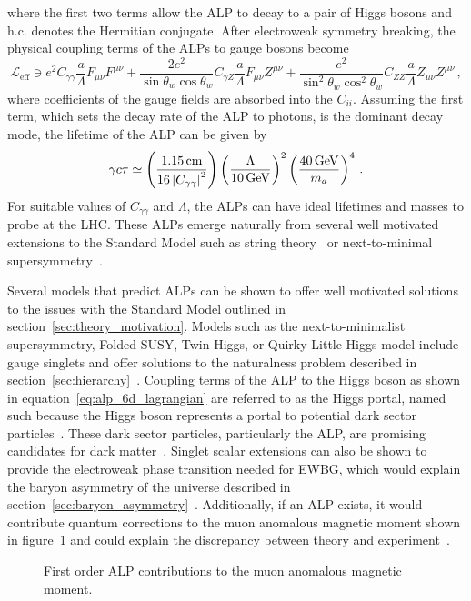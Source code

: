 where the first two terms allow the ALP to decay to a pair of Higgs bosons and h.c. denotes the Hermitian conjugate. After electroweak symmetry breaking, the physical coupling terms of the ALPs to gauge bosons become
\begin{equation}
	\mathcal{L}_\text{eff}\ni e^2C_{\gamma\gamma}\frac{a}{\Lambda}F_{\mu\nu}F^{\mu\nu}+\frac{2e^2}{\sin\theta_w\cos\theta_w}C_{\gamma Z}\frac{a}{\Lambda}F_{\mu\nu}Z^{\mu\nu}+\frac{e^2}{\sin^2\theta_w\cos^2\theta_w}C_{ZZ}\frac{a}{\Lambda}Z_{\mu\nu}Z^{\mu\nu}\,,
\end{equation}
where coefficients of the gauge fields are absorbed into the $C_{ii}$. Assuming the first term, which sets the decay rate of the ALP to photons, is the dominant decay mode, the lifetime of the ALP can be given by~\cite{Draper_2012}
\begin{equation}
	\gamma c\tau\simeq\left(\frac{1.15\unit{cm}}{16\left|C_{\gamma\gamma}\right|^2}\right)\left(\frac{\Lambda}{10\GeV}\right)^2\left(\frac{40\GeV}{m_a}\right)^4\,.
\end{equation}
For suitable values of $C_{\gamma\gamma}$ and $\Lambda$, the ALPs can have ideal lifetimes and masses to probe at the LHC. These ALPs emerge naturally from several well motivated extensions to the Standard Model such as string theory~\cite{axion_st1,axion_st2,axion_st3} or next-to-minimal supersymmetry~\cite{axion_ss1,axion_ss2}.

Several models that predict ALPs can be shown to offer well motivated solutions to the issues with the Standard Model outlined in section~\ref{sec:theory_motivation}. Models such as the next-to-minimalist supersymmetry, Folded SUSY, Twin Higgs, or Quirky Little Higgs model include gauge singlets and offer solutions to the naturalness problem described in section~\ref{sec:hierarchy}~\cite{hierarchy,hierarchy2}. Coupling terms of the ALP to the Higgs boson as shown in equation~\ref{eq:alp_6d_lagrangian} are referred to as the Higgs portal, named such because the Higgs boson represents a portal to potential dark sector particles~\cite{Curtin_2014}. These dark sector particles, particularly the ALP, are promising candidates for dark matter~\cite{alp_dm1,alp_dm2,alp_dm3,alp_dm4,alp_dm5,alp_dm6}. Singlet scalar extensions can also be shown to provide the electroweak phase transition needed for EWBG, which would explain the baryon asymmetry of the universe described in section~\ref{sec:baryon_asymmetry}~\cite{alp_ewbg1,alp_ewbg2}. Additionally, if an ALP exists, it would contribute quantum corrections to the muon anomalous magnetic moment shown in figure~\ref{fig:muon_magnetic_moment_alp} and could explain the discrepancy between theory and experiment~\cite{alp_colliders}.
\begin{figure}[htb!]
	\centering
	\begingroup
	
	
	\endgroup
	\caption[First order ALP contributions to the muon anomalous magnetic moment.]{First order ALP contributions to the muon anomalous magnetic moment.}
	\label{fig:muon_magnetic_moment_alp}
\end{figure}

